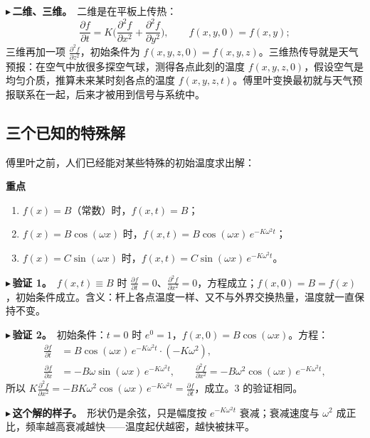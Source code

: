 \documentclass[UTF8,a4paper,11pt]{ctexart}
\newenvironment{remember}{\begin{rememberbox}\textbf{重点}\par\smallskip}{\end{rememberbox}}
\newcounter{ex}[section]
\newcommand{\point}[1]{\par\addvspace{1ex}\noindent\textcolor{ptteal}{$\blacktriangleright$\,\textbf{#1}}\ }
\begin{document}
\point{二维、三维。}二维是在平板上传热：
\[
\frac{\partial f}{\partial t}=K\Big(\frac{\partial^2 f}{\partial x^2}+\frac{\partial^2 f}{\partial y^2}\Big),\qquad f(x,y,0)=f(x,y);
\]
三维再加一项 $\frac{\partial^2 f}{\partial z^2}$，初始条件为 $f(x,y,z,0)=f(x,y,z)$。三维热传导就是天气预报：在空气中放很多探空气球，测得各点此刻的温度 $f(x,y,z,0)$，假设空气是均匀介质，推算未来某时刻各点的温度 $f(x,y,z,t)$。傅里叶变换最初就与天气预报联系在一起，后来才被用到信号与系统中。

\subsection{三个已知的特殊解}
傅里叶之前，人们已经能对某些特殊的初始温度求出解：
\begin{remember}
\begin{enumerate}[nosep]
\item $f(x)=B$（常数）时，$f(x,t)=B$；
\item $f(x)=B\cos(\omega x)$ 时，$f(x,t)=B\cos(\omega x)\,e^{-K\omega^2 t}$；
\item $f(x)=C\sin(\omega x)$ 时，$f(x,t)=C\sin(\omega x)\,e^{-K\omega^2 t}$。
\end{enumerate}
\end{remember}

\point{验证 1。}$f(x,t)\equiv B$ 时 $\frac{\partial f}{\partial t}=0$、$\frac{\partial^2 f}{\partial x^2}=0$，方程成立；$f(x,0)=B=f(x)$，初始条件成立。含义：杆上各点温度一样、又不与外界交换热量，温度就一直保持不变。

\point{验证 2。}初始条件：$t=0$ 时 $e^{0}=1$，$f(x,0)=B\cos(\omega x)$。方程：
\begin{align*}
\frac{\partial f}{\partial t}&=B\cos(\omega x)\,e^{-K\omega^2t}\cdot(-K\omega^2),\\
\frac{\partial f}{\partial x}&=-B\omega\sin(\omega x)\,e^{-K\omega^2t},\qquad
\frac{\partial^2 f}{\partial x^2}=-B\omega^2\cos(\omega x)\,e^{-K\omega^2t},
\end{align*}
所以 $K\frac{\partial^2 f}{\partial x^2}=-BK\omega^2\cos(\omega x)\,e^{-K\omega^2t}=\frac{\partial f}{\partial t}$，成立。3 的验证相同。

\point{这个解的样子。}形状仍是余弦，只是幅度按 $e^{-K\omega^2t}$ 衰减；衰减速度与 $\omega^2$ 成正比，频率越高衰减越快——温度起伏越密，越快被抹平。
\end{document}
